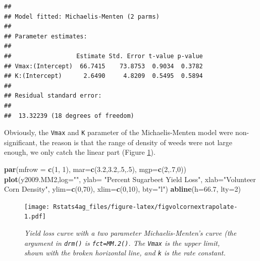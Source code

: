 \documentclass[letterpaper,]{book}
\newenvironment{Shaded}{\begin{snugshade}}{\end{snugshade}}
\newcommand{\DataTypeTok}[1]{\textcolor[rgb]{0.13,0.29,0.53}{#1}}
\newcommand{\DecValTok}[1]{\textcolor[rgb]{0.00,0.00,0.81}{#1}}
\newcommand{\FloatTok}[1]{\textcolor[rgb]{0.00,0.00,0.81}{#1}}
\newcommand{\KeywordTok}[1]{\textcolor[rgb]{0.13,0.29,0.53}{\textbf{#1}}}
\newcommand{\NormalTok}[1]{#1}
\newcommand{\StringTok}[1]{\textcolor[rgb]{0.31,0.60,0.02}{#1}}
\begin{document}
\begin{verbatim}
## 
## Model fitted: Michaelis-Menten (2 parms)
## 
## Parameter estimates:
## 
##                  Estimate Std. Error t-value p-value
## Vmax:(Intercept)  66.7415    73.8753  0.9034  0.3782
## K:(Intercept)      2.6490     4.8209  0.5495  0.5894
## 
## Residual standard error:
## 
##  13.32239 (18 degrees of freedom)
\end{verbatim}

Obviously, the \texttt{Vmax} and \texttt{K} parameter of the Michaelis-Menten model were non-significant, the reason is that the range of density of weeds were not large enough, we only catch the linear part (Figure \ref{fig:figvolcornextrapolate}).



\begin{Shaded}
\begin{Highlighting}[]
\KeywordTok{par}\NormalTok{(}\DataTypeTok{mfrow =} \KeywordTok{c}\NormalTok{(}\DecValTok{1}\NormalTok{, }\DecValTok{1}\NormalTok{), }\DataTypeTok{mar=}\KeywordTok{c}\NormalTok{(}\FloatTok{3.2}\NormalTok{,}\FloatTok{3.2}\NormalTok{,.}\DecValTok{5}\NormalTok{,.}\DecValTok{5}\NormalTok{), }\DataTypeTok{mgp=}\KeywordTok{c}\NormalTok{(}\DecValTok{2}\NormalTok{,.}\DecValTok{7}\NormalTok{,}\DecValTok{0}\NormalTok{))}
\KeywordTok{plot}\NormalTok{(y2009.MM2,}\DataTypeTok{log=}\StringTok{""}\NormalTok{, }
     \DataTypeTok{ylab=} \StringTok{"Percent Sugarbeet Yield Loss"}\NormalTok{,}
     \DataTypeTok{xlab=}\StringTok{"Volunteer Corn Density"}\NormalTok{,}
     \DataTypeTok{ylim=}\KeywordTok{c}\NormalTok{(}\DecValTok{0}\NormalTok{,}\DecValTok{70}\NormalTok{), }\DataTypeTok{xlim=}\KeywordTok{c}\NormalTok{(}\DecValTok{0}\NormalTok{,}\DecValTok{10}\NormalTok{), }\DataTypeTok{bty=}\StringTok{"l"}\NormalTok{)}
\KeywordTok{abline}\NormalTok{(}\DataTypeTok{h=}\FloatTok{66.7}\NormalTok{, }\DataTypeTok{lty=}\DecValTok{2}\NormalTok{)}
\end{Highlighting}
\end{Shaded}

\begin{figure}
\centering
\texttt{[image: Rstats4ag\_files/figure-latex/figvolcornextrapolate-1.pdf]}
\caption{\label{fig:figvolcornextrapolate}\emph{Yield loss curve with a two parameter Michaelis-Menten's curve (the argument in \texttt{drm()} is \texttt{fct=MM.2()}. The \texttt{Vmax} is the upper limit, shown with the broken horizontal line, and \texttt{k} is the rate constant.}}
\end{figure}
\end{document}

